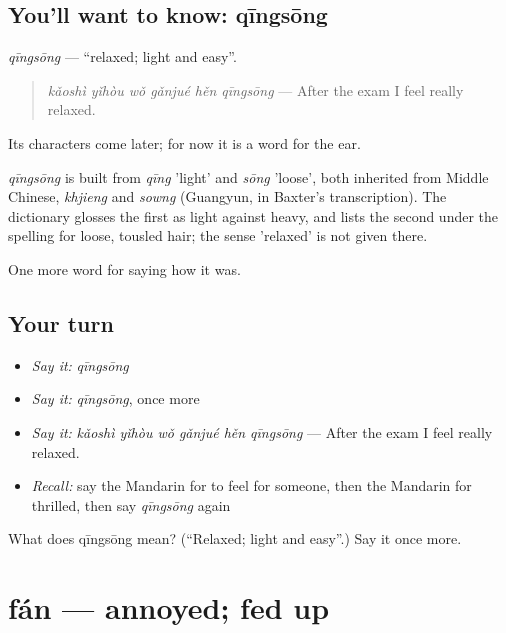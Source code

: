 \subsection*{You'll want to know: qīngsōng}
\emph{qīngsōng} — \textquotedblleft{}relaxed; light and easy\textquotedblright{}.

\begin{quote}
\emph{kǎoshì yǐhòu wǒ gǎnjué hěn qīngsōng} — After the exam I feel really relaxed.
\end{quote}

Its characters come later; for now it is a word for the ear.

\begin{cousinweb}
\emph{qīngsōng} is built from \emph{qīng} 'light' and \emph{sōng} 'loose', both inherited from Middle Chinese, \emph{khjieng} and \emph{sowng} (Guangyun, in Baxter's transcription). The dictionary glosses the first as light against heavy, and lists the second under the spelling for loose, tousled hair; the sense 'relaxed' is not given there.
\end{cousinweb}

\begin{grammarlens}[title={What you've built}]
One more word for saying how it was.
\end{grammarlens}

\subsection*{Your turn}
\begin{itemize}
\raggedright
  \item \emph{Say it:} \emph{qīngsōng}
  \item \emph{Say it:} \emph{qīngsōng}, once more
  \item \emph{Say it:} \emph{kǎoshì yǐhòu wǒ gǎnjué hěn qīngsōng} — After the exam I feel really relaxed.
  \item \emph{Recall:} say the Mandarin for to feel for someone, then the Mandarin for thrilled, then say \emph{qīngsōng} again
\end{itemize}

\begin{tcolorbox}[breakable,colback=teal!4,colframe=teal!35!black,title={Before you move on}]
What does qīngsōng mean? (\textquotedblleft{}Relaxed; light and easy\textquotedblright{}.) Say it once more.
\end{tcolorbox}
\section[fán]{fán — annoyed; fed up}

